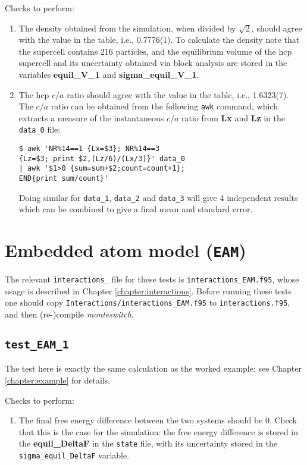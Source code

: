 \documentclass{report}
\begin{document}
Checks to perform:
\begin{enumerate}
\item
The density obtained from the simulation, when divided by $\sqrt{2}$, should agree with the value in the table,
i.e., 0.7776(1). To calculate the density note that the supercell contains 216 particles, and the equilibrium
volume of the hcp supercell and its uncertainty obtained via block analysis are stored in the variables
\textbf{equil\_V\_1} and \textbf{sigma\_equil\_V\_1}.
\item
The hcp $c/a$ ratio should agree with the value in the table, i.e., 1.6323(7). The $c/a$ ratio can be obtained from
the following \texttt{awk} command, which extracts a measure of the instantaneous $c/a$ ratio from \textbf{Lx} and \textbf{Lz} in the
\texttt{data\_0} file:
\begin{verbatim}
$ awk 'NR%14==1 {Lx=$3}; NR%14==3 
{Lz=$3; print $2,(Lz/6)/(Lx/3)}' data_0 
| awk '$1>0 {sum=sum+$2;count=count+1}; 
END{print sum/count}'
\end{verbatim}
Doing similar for \texttt{data\_1}, \texttt{data\_2} and \texttt{data\_3} will give 4 independent results which can be combined
to give a final mean and standard error.
\end{enumerate}


\section{Embedded atom model (\texttt{EAM})}
The relevant \texttt{interactions\_} file for these tests is \texttt{interactions\_EAM.f95}, whose usage is described in Chapter
\ref{chapter:interactions}. Before running these tests one should copy \texttt{Interactions/interactions\_EAM.f95}
to \texttt{interactions.f95}, and then (re-)compile \emph{monteswitch}.


\subsection{\texttt{test\_EAM\_1}}
The test here is exactly the same calculation as the worked example; see Chapter \ref{chapter:example} for details.

Checks to perform:
\begin{enumerate}
\item
The final free energy difference between the two systems should be 0. Check that this is the case for the
simulation: the free energy difference is stored in the \textbf{equil\_DeltaF} in the \texttt{state} file, with its uncertainty
stored in the \texttt{sigma\_equil\_DeltaF} variable.
\end{enumerate}
\end{document}
